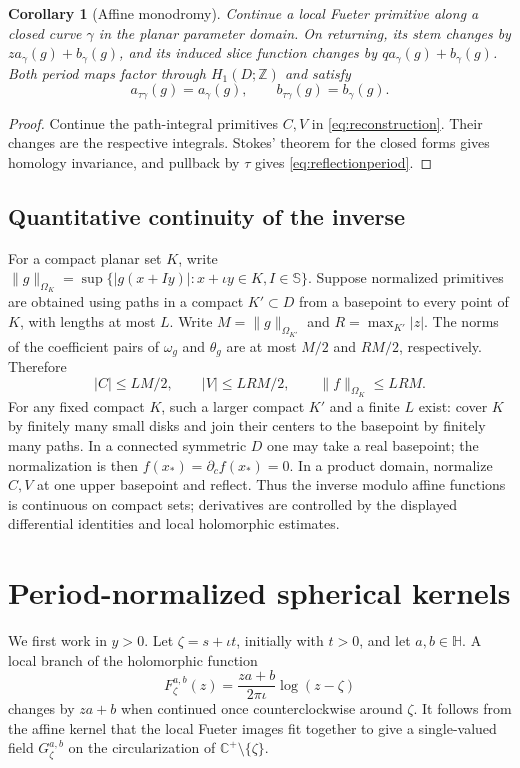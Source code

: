 \documentclass[11pt,a4paper]{article}
\numberwithin{equation}{section}
\newtheorem{corollary}[theorem]{Corollary}
\theoremstyle{definition}
\theoremstyle{remark}
\newcommand{\C}{\mathbb C}
\newcommand{\HH}{\mathbb H}
\newcommand{\SSS}{\mathbb S}
\begin{document}
\begin{corollary}[Affine monodromy]
\label{cor:monodromy}
Continue a local Fueter primitive along a closed curve $\gamma$ in the
planar parameter domain. On returning, its stem changes by
$z a_\gamma(g)+b_\gamma(g)$, and its induced slice function changes by
$qa_\gamma(g)+b_\gamma(g)$. Both period maps factor through
$H_1(D;\mathbb Z)$ and satisfy
\begin{equation}
 a_{\tau\gamma}(g)=a_\gamma(g),\qquad
 b_{\tau\gamma}(g)=b_\gamma(g).
 \label{eq:reflectionperiod}
\end{equation}
\end{corollary}
\begin{proof}
Continue the path-integral primitives $C,V$ in
\eqref{eq:reconstruction}. Their changes are the respective integrals.
Stokes' theorem for the closed forms gives homology invariance, and
pullback by $\tau$ gives \eqref{eq:reflectionperiod}.
\end{proof}

\subsection{Quantitative continuity of the inverse}
For a compact planar set $K$, write
$\|g\|_{\Omega_K}=\sup\{|g(x+Iy)|:x+\iota y\in K,I\in\SSS\}$.
Suppose normalized primitives are obtained using paths in a compact
$K'\subset D$ from a basepoint to every point of $K$, with lengths at
most $L$. Write $M=\|g\|_{\Omega_{K'}}$ and
$R=\max_{K'}|z|$. The norms of the coefficient pairs of $\omega_g$ and
$\theta_g$ are at most $M/2$ and $RM/2$, respectively. Therefore
\begin{equation}
 |C|\leq LM/2,
 \qquad |V|\leq LRM/2,
 \qquad \|f\|_{\Omega_K}\leq LRM.
 \label{eq:inversebound}
\end{equation}
For any fixed compact $K$, such a larger compact $K'$ and a finite $L$
exist: cover $K$ by finitely many small disks and join their centers to
the basepoint by finitely many paths. In a connected symmetric $D$ one
may take a real basepoint; the normalization is then
$f(x_*)=\partial_c f(x_*)=0$. In a product domain, normalize $C,V$ at
one upper basepoint and reflect. Thus the inverse modulo affine functions
is continuous on compact sets; derivatives are controlled by the displayed
differential identities and local holomorphic estimates.

\section{Period-normalized spherical kernels}
\label{sec:kernels}
We first work in $y>0$. Let $\zeta=s+\iota t$, initially with $t>0$,
and let $a,b\in\HH$. A local branch of the holomorphic function
\begin{equation}
 F_\zeta^{a,b}(z)=\frac{za+b}{2\pi\iota}\log(z-\zeta)
 \label{eq:logstem}
\end{equation}
changes by $za+b$ when continued once counterclockwise around $\zeta$.
It follows from the affine kernel that the local Fueter images fit
together to give a single-valued field $G_\zeta^{a,b}$ on the
circularization of $\C^+\setminus\{\zeta\}$.
\end{document}
